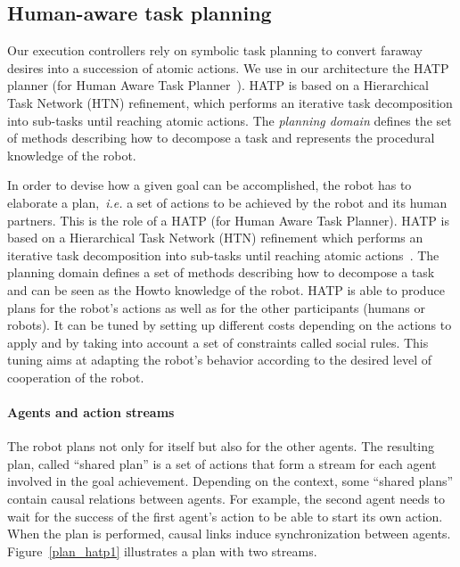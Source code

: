 \documentclass[preprint,5p]{elsarticle}
\begin{document}

\subsection{Human-aware task planning}

Our execution controllers rely on symbolic task planning to convert faraway
desires into a succession of atomic actions. We use in our architecture the
HATP planner (for Human Aware Task Planner~\cite{Alili2009}).  HATP is based on
a Hierarchical Task Network (HTN) refinement, which performs an iterative task
decomposition into sub-tasks until reaching atomic actions. The \emph{planning
domain} defines the set of methods describing how to decompose a task and
represents the procedural knowledge of the robot.

In order to devise how a given goal can be accomplished, the robot has
to elaborate a plan,~\textit{i.e.} a set of actions to be achieved by
the robot and its human partners.  This is the role of a HATP
\cite{Alili2008} (for Human Aware Task Planner).  HATP is based on a
Hierarchical Task Network (HTN) refinement which performs an iterative
task decomposition into sub-tasks until reaching atomic
actions~\cite{Nau2003}.  The planning domain defines a set of methods
describing how to decompose a task and can be seen as the Howto
knowledge of the robot.  HATP is able to produce plans for the robot's
actions as well as for the other participants (humans or robots). It
can be tuned by setting up different costs depending on the actions to
apply and by taking into account a set of constraints called social
rules. This tuning aims at adapting the robot's behavior according to
the desired level of cooperation of the robot.

\paragraph{Agents and action streams}
The robot plans not only for itself but also for the other agents. The
resulting plan, called ``shared plan'' is a set of actions that form
a stream for each agent involved in the goal achievement. Depending on
the context, some ``shared plans'' contain causal relations between
agents. For example, the second agent needs to wait for the success of
the first agent's action to be able to start its own action. When the
plan is performed, causal links induce synchronization between
agents. Figure~\ref{plan_hatp1} illustrates a plan with two streams.
\end{document}
